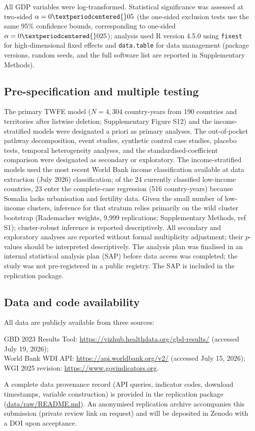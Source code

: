 \documentclass[12pt,a4paper]{article}
\begin{document}
All GDP variables were log-transformed. Statistical significance was assessed
at two-sided $\alpha = 0{\textperiodcentered{}}05$ (the one-sided exclusion tests use the same 95\% confidence bounds, corresponding to one-sided $\alpha = 0{\textperiodcentered{}}025$); analysis used R version 4.5.0
using \texttt{fixest} for high-dimensional fixed effects and
\texttt{data.table} for data management (package versions, random seeds, and the full software list are reported in Supplementary Methods).

\subsection*{Pre-specification and multiple testing}

The primary TWFE model ($N = 4{,}304$ country-years from 190 countries and territories after listwise deletion; Supplementary Figure S12) and the income-stratified models were
designated a priori as primary analyses. The out-of-pocket pathway decomposition, event studies, synthetic control case studies, placebo tests, temporal heterogeneity analyses, and the standardised-coefficient comparison were designated as secondary or exploratory. The income-stratified models used the most recent World Bank income classification available at data extraction (July 2026)
classification; of the 24 currently classified low-income countries, 23 enter
the complete-case regression (516 country-years) because Somalia lacks
urbanisation and fertility data. Given the small number of low-income clusters, inference for that stratum relies primarily on the wild cluster bootstrap (Rademacher weights, 9{,}999 replications; Supplementary Methods, ref S1); cluster-robust inference is reported descriptively. All secondary and exploratory analyses are reported without formal
multiplicity adjustment; their $p$-values should be interpreted descriptively. The analysis plan was finalised in an internal statistical analysis plan (SAP) before data access was completed; the study was not pre-registered in a public registry. The SAP is included in the replication package.

\subsection*{Data and code availability}

All data are publicly available from three sources:
\begin{flushleft}
GBD 2023 Results Tool: \url{https://vizhub.healthdata.org/gbd-results/}
(accessed July 19, 2026);\\
World Bank WDI API: \url{https://api.worldbank.org/v2/} (accessed July
15, 2026);\\
WGI 2025 revision: \url{https://www.govindicators.org}.
\end{flushleft} A complete data provenance record (API queries, indicator codes, download timestamps, variable construction) is provided in the replication package (\url{data/raw/README.md}). An anonymised replication archive accompanies this submission (private review link on request) and will be deposited in Zenodo with a DOI upon acceptance.
\end{document}
